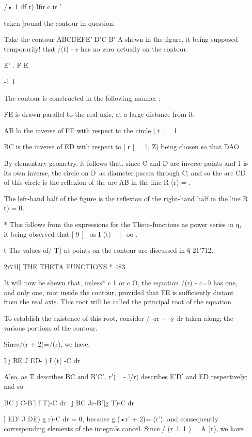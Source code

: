 /• 1 df r) Ifir c ir '

taken ]round the contour in question.

Take the contour ABCDEFE' D'C B' A shewn in the figure, it being
supposed temporarily! that /(t) - c has no zero actually on the
contour.

E' . F E

-1 1

The contour is constructed in the following manner :

FE is drawn parallel to the real axis, at a large distance from it.

AB la the inverse of FE with respect to the circle | t | = 1.

BC is the inverse of ED with respect to [ r | = 1, Z) being chosen so
that D\=AO.

By elementary geometry, it follows that, since C and D are inverse
points and 1 is its own inverse, the circle on D\ as diameter passes
through C; and so the arc CD of this circle is the reflexion of the
arc AB in the line R (r) = .

The left-hand half of the figure is the reflexion of the right-hand
half in the line R t) = 0.

* This follows from the expressions for the Tlieta-functions as power
series in q, it being observed that [ 9 [ - as I (t) - -|- oo .

t The values of/ T) at points on the contour are discussed in §
21'712.

2r71l] THE THETA FUNCTIONS * 483

It will now be shewn that, unless* c 1 or c O, the equation /(r) - c=0
has one, and only one, root inside the contour, provided that FE is
sufficiently distant from the real axis. This root will be called the
principal root of the equation.

To establish the existence of this root, consider / -rr\ - --y dr
taken along; the various portions of the contour.

Since/(r + 2)=/(r), we have,

I j BE J ED- ) f (t) -C dr

Also, as T describes BC and B'C", r'(= - l/r) describes E'D' and ED
respectively; and so

   BC j C-B'] f T)-C dr \ j BC Jc-B']g T)-C dr

 ] ED' J DE) g r)-C dr = 0, because g (•r' + 2)= (r'), and
consequently corresponding elements of the integrals cancel. Since /
(r ± 1 ) = A (r), we have

